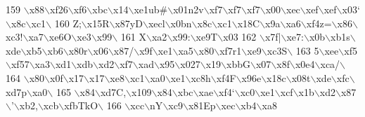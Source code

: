 \begin{DoxyCode}
159 \textcolor{stringliteral}{\(\backslash\)x88\(\backslash\)xf26\(\backslash\)xf6\(\backslash\)xbc\(\backslash\)x14\(\backslash\)xe1ub#\(\backslash\)x01n2v\(\backslash\)xf7\(\backslash\)xf7\(\backslash\)xf7\(\backslash\)x00\(\backslash\)xec\(\backslash\)xef\(\backslash\)xef\(\backslash\)x03`\(\backslash\)x8c\(\backslash\)xc1\(\backslash\)}
160 \textcolor{stringliteral}{Z;\(\backslash\)x15R\(\backslash\)x87yD\(\backslash\)xecl\(\backslash\)x0bn\(\backslash\)x8c\(\backslash\)xc1\(\backslash\)x18C\(\backslash\)x9a\(\backslash\)xa6\(\backslash\)xf4z=\(\backslash\)x86\(\backslash\)xc3!\(\backslash\)xa7\(\backslash\)xe6O\(\backslash\)xe3\(\backslash\)x99\(\backslash\)}
161 \textcolor{stringliteral}{X\(\backslash\)xa2\(\backslash\)x99:\(\backslash\)xe9T\(\backslash\)x03%
162 \textcolor{stringliteral}{\(\backslash\)x7f|\(\backslash\)xe7:\(\backslash\)x0b\(\backslash\)xb1s\(\backslash\)xde\(\backslash\)xb5\(\backslash\)xb6\(\backslash\)x80r\(\backslash\)x06\(\backslash\)x87/\(\backslash\)x9f\(\backslash\)xe1\(\backslash\)xa5\(\backslash\)x80\(\backslash\)xf7r1\(\backslash\)xe9\(\backslash\)xc3S\(\backslash\)}
163 \textcolor{stringliteral}{5\(\backslash\)xee\(\backslash\)xf5\(\backslash\)xf57\(\backslash\)xa3\(\backslash\)xd1\(\backslash\)xdb\(\backslash\)xd2\(\backslash\)xf7\(\backslash\)xad\(\backslash\)x95\(\backslash\)x027\(\backslash\)x19\(\backslash\)xbbG\(\backslash\)x07\(\backslash\)x8f\(\backslash\)x0e4\(\backslash\)xca/\(\backslash\)}
164 \textcolor{stringliteral}{\(\backslash\)x80\(\backslash\)x0f\(\backslash\)x17\(\backslash\)x17\(\backslash\)xe8\(\backslash\)xc1\(\backslash\)xa0\(\backslash\)xe1\(\backslash\)xc8h\(\backslash\)xf4F\(\backslash\)x96e\(\backslash\)x18c\(\backslash\)x08t\(\backslash\)xde\(\backslash\)xfc\(\backslash\)xd7p\(\backslash\)xa0\(\backslash\)}
165 \textcolor{stringliteral}{\(\backslash\)x84\(\backslash\)xd7C,\(\backslash\)x109\(\backslash\)x84\(\backslash\)xbc\(\backslash\)xae\(\backslash\)xf4`\(\backslash\)xc0\(\backslash\)xe1\(\backslash\)xcf\(\backslash\)x1b\(\backslash\)xd2\(\backslash\)x87\(\backslash\)'\(\backslash\)xb2,\(\backslash\)xcb\(\backslash\)xfbTkO\(\backslash\)}
166 \textcolor{stringliteral}{\(\backslash\)xcc\(\backslash\)nY\(\backslash\)xc9\(\backslash\)x81Ep\(\backslash\)xec\(\backslash\)xb4\(\backslash\)xa8%
}}
\end{DoxyCode}
